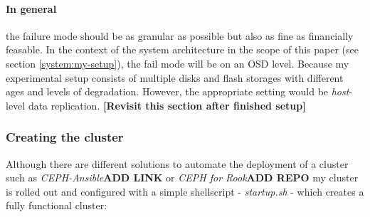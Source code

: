 \documentclass[titlepage, a4paper, 11pt]{scrartcl}
\begin{document}
                \paragraph{In general} the failure mode should be as granular as possible but also as fine as financially feasable.
                In the context of the system architecture in the scope of this paper (see section \ref{system:my-setup}), the fail mode will be on an OSD level.
                Because my experimental setup consists of multiple disks and flash storages with different ages and levels of degradation.
                However, the appropriate setting would be \textit{host}-level data replication. \textbf{[Revisit this section after finished setup]}

            \subsubsection{Creating the cluster}

                Although there are different solutions to automate the deployment of a cluster such as \textit{CEPH-Ansible}\textbf{ADD LINK} or \textit{CEPH for Rook}\textbf{ADD REPO}
                my cluster is rolled out and configured with a simple shellscript - \textit{startup.sh} - which creates a fully functional cluster:
\end{document}
